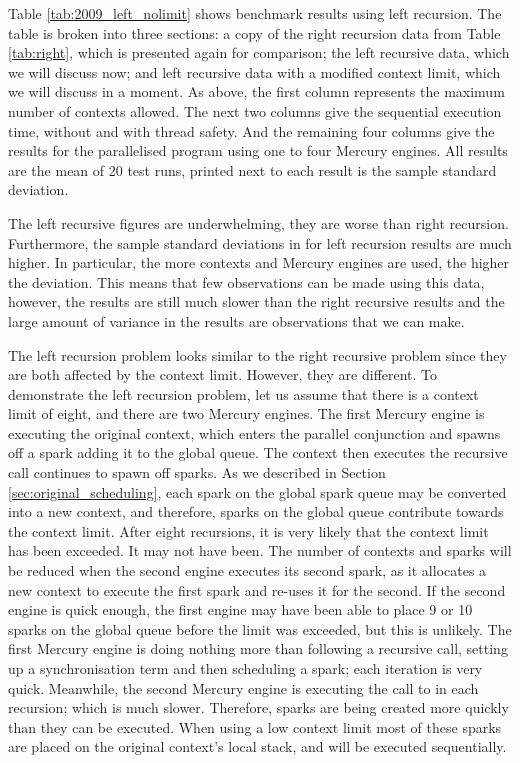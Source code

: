 Table \ref{tab:2009_left_nolimit} shows benchmark results using left
recursion.
The table is broken into three sections:
a copy of the right recursion data from Table \ref{tab:right},
which is presented again for comparison;
the left recursive data,
which we will discuss now;
and left recursive data with a modified context limit,
which we will discuss in a moment.
As above, the first column represents the maximum number of contexts
allowed.
The next two columns give the sequential execution time, without and
with thread safety.
And the remaining four columns give the results for the parallelised
program using one to four Mercury engines.
All results are the mean of 20 test runs,
printed next to each result is the sample standard deviation.

The left recursive figures are underwhelming, they are worse than right
recursion.
Furthermore,
the sample standard deviations in for left recursion results are much
higher.
In particular,
the more contexts and Mercury engines are used, the higher the
deviation.
This means that few observations can be made using this data,
however,
the results are still much slower than the right recursive results and
the large amount of variance in the results are observations that we can
make.

The left recursion problem looks similar to the right recursive problem
since they are both affected by the context limit.
However, they are different.
To demonstrate the left recursion problem,
let us assume that there is a context limit of eight,
and there are two Mercury engines.
The first Mercury engine is executing the original context,
which enters the parallel conjunction and spawns off a spark adding it
to the global queue.
The context then executes the recursive call continues to spawn off
sparks.
As we described in Section \ref{sec:original_scheduling},
each spark on the global spark queue may be converted into a new
context,
and therefore, sparks on the global queue contribute towards the context
limit.
After eight recursions,
it is very likely that the context limit has been exceeded.
It may not have been.
The number of contexts and sparks will be reduced
when the second engine executes its second spark,
as it allocates a new context to execute the first spark and re-uses it
for the second.
If the second engine is quick enough,
the first engine may have been able to place 9 or 10 sparks on the
global queue before the limit was exceeded,
but this is unlikely.
The first Mercury engine is doing nothing more than following a
recursive call,
setting up a synchronisation term and
then scheduling a spark;
each iteration is very quick.
Meanwhile,
the second Mercury engine is executing the call to  in each
recursion;
which is much slower.
Therefore,
sparks are being created more quickly than they can be executed.
When using a low context limit most of these sparks are placed on
the original context's local stack,
and will be executed sequentially.

